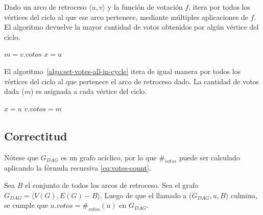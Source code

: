 Dado un arco de retroceso $\langle u, v \rangle$ y la funci\'on de votaci\'on $f$, \maxincyclecaption \;itera por todos los v\'ertices del ciclo al que ese arco pertenece, mediante m\'ultiples aplicaciones de $f$. El algoritmo devuelve la mayor cantidad de votos obtenidos por alg\'un v\'ertice del ciclo. 

\begin{algorithm}[!h]
    \caption{\maxincyclecaption}
    \label{algo:max-in-cycle}
    \DontPrintSemicolon
    \SetAlgoLined
    \BlankLine

    $m = v.votos$\;\label{algo:max-in-cycle:line:m-declaration}
    $x = u$\;
    \;
\end{algorithm}

El algoritmo~\ref{algo:set-votes-all-in-cycle} itera de igual manera por todos los v\'ertices del ciclo al que pertenece el arco de retroceso dado. La cantidad de votos dada ($m$) es asignada a cada v\'ertice del ciclo.

\begin{algorithm}[!h]
    \caption{\setvotestoallincyclecaption}
    \label{algo:set-votes-all-in-cycle}
    \DontPrintSemicolon
    \SetAlgoLined
    \BlankLine

    $x = u$\;
    $v.votos = m$\;
\end{algorithm}

\subsection{Correctitud}

N\'otese que $G_{DAG}$ es un grafo ac\'iclico, por lo que  $\#_{votos}$ puede ser calculado aplicando la f\'ormula recursiva \eqref{eq:votes-count}. 


\begin{lemma}\label{lemma:dfs-visit}
    Sea $B$ el conjunto de todos los arcos de retroceso. Sea el grafo $G_{DAG} = \langle V(G), E(G) - B \rangle$.  Luego de que el llamado a \dfsvisitcaption($G_{DAG}, u, B$) culmina, se cumple que $u.votos = \#_{votos}(u)$ en $G_{DAG}$.
\end{lemma}

